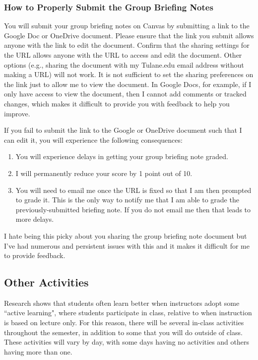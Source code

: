 \documentclass[11pt,letterpaper,final]{article}
\begin{document}
\subsubsection{How to Properly Submit the Group Briefing Notes}
You will submit your group briefing notes on Canvas by submitting a link to the Google Doc or OneDrive document. Please ensure that the link you submit allows anyone with the link to edit the document. Confirm that the sharing settings for the URL allows anyone with the URL to access and edit the document. Other options (e.g., sharing the document with my Tulane.edu email address without making a URL) will not work. It is not sufficient to set the sharing preferences on the link just to allow me to view the document. In Google Docs, for example, if I only have access to view the document, then I cannot add comments or tracked changes, which makes it difficult to provide you with feedback to help you improve. 

If you fail to submit the link to the Google or OneDrive document such that I can edit it, you will experience the following consequences:
\begin{enumerate}
\item You will experience delays in getting your group briefing note graded.
\item I will permanently reduce your score by 1 point out of 10. 
\item You will need to email me once the URL is fixed so that I am then prompted to grade it. This is the only way to notify me that I am able to grade the previously-submitted briefing note. If you do not email me then that leads to more delays. 
\end{enumerate}

I hate being this picky about you sharing the group briefing note document but I've had numerous and persistent issues with this and it makes it difficult for me to provide feedback.

\subsection{Other Activities}
Research shows that students often learn better when instructors adopt some ``active learning", where students participate in class, relative to when instruction is based on lecture only. For this reason, there will be several in-class activities throughout the semester, in addition to some that you will do outside of class. These activities will vary by day, with some days having no activities and others having more than one.
\end{document}
